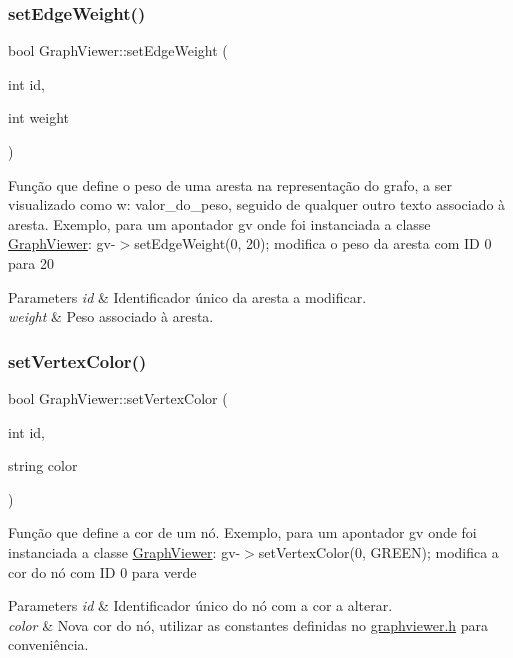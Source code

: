 \subsubsection{\texorpdfstring{set\+Edge\+Weight()}{setEdgeWeight()}}
{\footnotesize\ttfamily bool Graph\+Viewer\+::set\+Edge\+Weight (\begin{DoxyParamCaption}\item[{int}]{id,  }\item[{int}]{weight }\end{DoxyParamCaption})}

Função que define o peso de uma aresta na representação do grafo, a ser visualizado como w\+: valor\+\_\+do\+\_\+peso, seguido de qualquer outro texto associado à aresta. Exemplo, para um apontador gv onde foi instanciada a classe \mbox{\hyperlink{class_graph_viewer}{Graph\+Viewer}}\+: gv-\/$>$set\+Edge\+Weight(0, 20); modifica o peso da aresta com ID 0 para 20


\begin{DoxyParams}{Parameters}
{\em id} & Identificador único da aresta a modificar. \\
\hline
{\em weight} & Peso associado à aresta. \\
\hline
\end{DoxyParams}
\mbox{\label{class_graph_viewer_a8b542d7e09e81a45a74760c19233beb0}} 
\subsubsection{\texorpdfstring{set\+Vertex\+Color()}{setVertexColor()}}
{\footnotesize\ttfamily bool Graph\+Viewer\+::set\+Vertex\+Color (\begin{DoxyParamCaption}\item[{int}]{id,  }\item[{string}]{color }\end{DoxyParamCaption})}

Função que define a cor de um nó. Exemplo, para um apontador gv onde foi instanciada a classe \mbox{\hyperlink{class_graph_viewer}{Graph\+Viewer}}\+: gv-\/$>$set\+Vertex\+Color(0, G\+R\+E\+E\+N); modifica a cor do nó com ID 0 para verde


\begin{DoxyParams}{Parameters}
{\em id} & Identificador único do nó com a cor a alterar. \\
\hline
{\em color} & Nova cor do nó, utilizar as constantes definidas no \mbox{\hyperlink{graphviewer_8h}{graphviewer.\+h}} para conveniência. \\
\hline
\end{DoxyParams}
\mbox{\label{class_graph_viewer_a02d5f7393eab9a2d1b66719039597a64}} 
